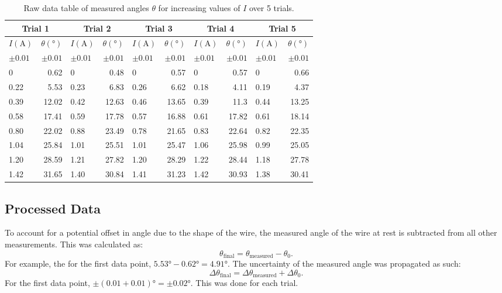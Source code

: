 \begin{table}[H]
	\centering
	\onehalfspacing
	\begin{tabular}{|lr||lr||lr||lr||lr|}
		\hline
		\multicolumn{2}{|c||}{Trial 1} & \multicolumn{2}{|c||}{Trial 2} & \multicolumn{2}{c||}{Trial 3}& \multicolumn{2}{c||}{Trial 4}& \multicolumn{2}{c|}{Trial 5} \\
		\hline
		$I(\si{\ampere})$ & $\theta(\si{\degree})$ & $I(\si{\ampere})$ & $\theta(\si{\degree})$ & $I(\si{\ampere})$ & $\theta(\si{\degree})$ & $I(\si{\ampere})$ & $\theta(\si{\degree})$ & $I(\si{\ampere})$ & $\theta(\si{\degree})$ \\
		$\pm0.01$ & $\pm0.01$ & $\pm0.01$ & $\pm0.01$ & $\pm0.01$ & $\pm0.01$ & $\pm0.01$ & $\pm0.01$ & $\pm0.01$ & $\pm0.01$ \\
		\hline
		0 & 0.62 & 0 & 0.48 & 0 & 0.57 & 0 & 0.57 & 0 & 0.66 \\
		0.22 & 5.53 & 0.23 & 6.83 & 0.26 & 6.62 & 0.18 & 4.11 & 0.19 & 4.37 \\
		0.39 & 12.02 & 0.42 & 12.63 & 0.46 & 13.65 & 0.39 & 11.3 & 0.44 & 13.25 \\
		0.58 & 17.41 & 0.59 & 17.78 & 0.57 & 16.88 & 0.61 & 17.82 & 0.61 & 18.14 \\
		0.80 & 22.02 & 0.88 & 23.49 & 0.78 & 21.65 & 0.83 & 22.64 & 0.82 & 22.35 \\
		1.04 & 25.84 & 1.01 & 25.51 & 1.01 & 25.47 & 1.06 & 25.98 & 0.99 & 25.05 \\
		1.20 & 28.59 & 1.21 & 27.82 & 1.20 & 28.29 & 1.22 & 28.44 & 1.18 & 27.78 \\
		1.42 & 31.65 & 1.40 & 30.84 & 1.41 & 31.23 & 1.42 & 30.93 & 1.38 & 30.41 \\
		\hline
	\end{tabular}
	\caption{Raw data table of measured angles $\theta$ for increasing values of $I$ over 5 trials.}
	\label{tab:raw1}
\end{table}

\newpage

\subsection*{Processed Data}

To account for a potential offset in angle due to the shape of the wire, the measured angle of the wire at rest is subtracted from all other measurements.
This was calculated as:
\begin{equation*}
	\theta_{\text{final}} = \theta_{\text{measured}} - \theta_0 \text{.}
\end{equation*}
For example, the for the first data point, $5.53\si{\degree} - 0.62\si{\degree} = 4.91\si{\degree}$.
The uncertainty of the measured angle was propagated as such:
\begin{equation*}
	\Delta\theta_{\text{final}} = \Delta\theta_{\text{measured}} + \Delta\theta_0 \text{.}
\end{equation*}
For the first data point, $\pm(0.01 + 0.01)\si{\degree} = \pm0.02\si{\degree}$.
This was done for each trial.

